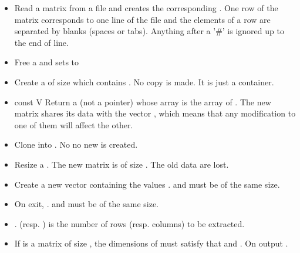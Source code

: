 \begin{itemize}
\item {}
  \sshortdescribe Read a matrix from a file and creates the corresponding
  \PnlMat. One row of the matrix corresponds to one line of the file and 
  the elements of a row are separated by blanks (spaces or tabs). Anything after a '\#' is
  ignored up to the end of line.

\item {}
  \sshortdescribe Free a \PnlMat and sets  to  
\item {}
    \sshortdescribe Create a \PnlMat of size  
    which contains . No copy is made. It is just a container.
\item {}
  {const \PnlVect \ptr V}
  \sshortdescribe Return a \PnlMat (not a pointer) whose array is
  the array of . The new matrix shares its data with the
  vector , which means that any modification to one of them will affect
  the other.


\item {}
  \sshortdescribe Clone  into . No no new
  \PnlMat is created.

\item {}
  \sshortdescribe Resize a \PnlMat. The new matrix is of size
  . The old data are lost.
\item {}
  \sshortdescribe Create a new vector containing the values .  and  must be of the same size.

\item {}
  \sshortdescribe On exit, .  and
   must be of the same size.

\item {}
  \sshortdescribe {}. 
  (resp. ) is the number of rows (resp. columns) to be extracted.
  
\item {}
    \sshortdescribe If  is a matrix of size ,
    the dimensions of  must satisfy that  and 
    . On output . 
\end{itemize}  


